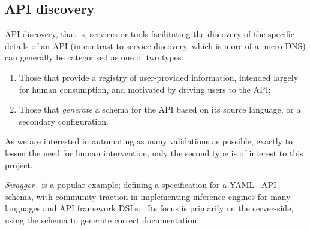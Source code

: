 \subsection{API discovery} \label{soln:api-discovery}

API discovery, that is, services or tools facilitating the discovery of the specific details of an API (in contrast to service discovery, which is more of a micro-DNS) can generally be categorised as one of two types:

\begin{enumerate}
\item Those that provide a registry of user-provided information, intended largely for human consumption, and motivated by driving users to the API;
\item Those that \emph{generate} a schema for the API based on its source language, or a secondary configuration.
\end{enumerate}

As we are interested in automating as many validations as possible, exactly to lessen the need for human intervention, only the second type is of interest to this project.

\emph{Swagger}~\cite{swagger} is a popular example; defining a specification for a YAML~\cite{yaml} API schema, with community traction in implementing inference engines for many languages and API framework DSLs.~\cite{swagger_oss} Its focus is primarily on the server-side, using the schema to generate correct documentation. 
